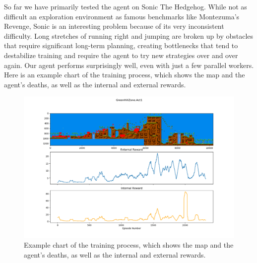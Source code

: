 So far we have primarily tested the agent on Sonic The Hedgehog. While not as difficult an exploration environment as famous benchmarks like Montezuma's Revenge, Sonic is an interesting problem because of its very inconsistent difficulty. Long stretches of running right and jumping are broken up by obstacles that require significant long-term planning, creating bottlenecks that tend to destabilize training and require the agent to try new strategies over and over again. Our agent performs surprisingly well, even with just a few parallel workers. Here is an example chart of the training process, which shows the map and the agent's deaths, as well as the internal and external rewards.

\begin{figure}[!hbtp]
\includegraphics[width=\textwidth]{images/mlunder_figure}
\caption{Example chart of the training process, which shows the map and the agent's deaths, as well as the internal and external rewards. \cite{github:mlunder} }
\end{figure}





